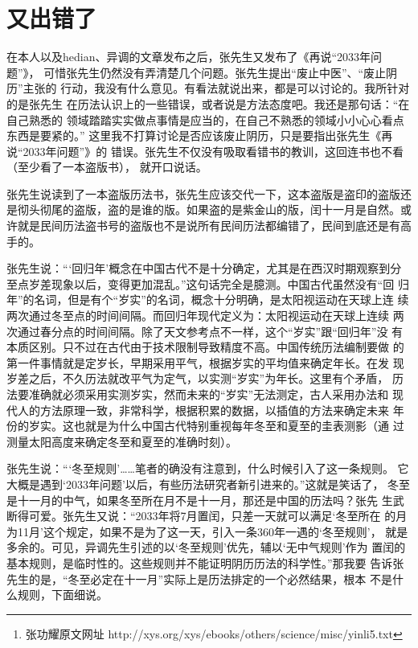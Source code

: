 \chapter{又出错了}

\subtitle{——评张功耀《再说“2033年问题”》\footnote{张功耀原文网址 http://xys.org/xys/ebooks/others/science/misc/yinli5.txt}}

在本人以及hedian、异调的文章发布之后，张先生又发布了《再说“2033年问题”》，
可惜张先生仍然没有弄清楚几个问题。张先生提出“废止中医”、“废止阴历”主张的
行动，我没有什么意见。有看法就说出来，都是可以讨论的。我所针对的是张先生
在历法认识上的一些错误，或者说是方法态度吧。我还是那句话：“在自己熟悉的
领域踏踏实实做点事情是应当的，在自己不熟悉的领域小小心心看点东西是要紧的。”
这里我不打算讨论是否应该废止阴历，只是要指出张先生《再说“2033年问题”》的
错误。张先生不仅没有吸取看错书的教训，这回连书也不看（至少看了一本盗版书），
就开口说话。

张先生说读到了一本盗版历法书，张先生应该交代一下，这本盗版是盗印的盗版还
是彻头彻尾的盗版，盗的是谁的版。如果盗的是紫金山的版，闰十一月是自然。或
许就是民间历法盗书号的盗版也不是说所有民间历法都编错了，民间到底还是有高
手的。

张先生说：“‘回归年’概念在中国古代不是十分确定，尤其是在西汉时期观察到分
至点岁差现象以后，变得更加混乱。”这句话完全是臆测。中国古代虽然没有“回
归年”的名词，但是有个“岁实”的名词，概念十分明确，是太阳视运动在天球上连
续两次通过冬至点的时间间隔。而回归年现代定义为：太阳视运动在天球上连续
两次通过春分点的时间间隔。除了天文参考点不一样，这个“岁实”跟“回归年”没
有本质区别。只不过在古代由于技术限制导致精度不高。中国传统历法编制要做
的第一件事情就是定岁长，早期采用平气，根据岁实的平均值来确定年长。在发
现岁差之后，不久历法就改平气为定气，以实测“岁实”为年长。这里有个矛盾，
历法要准确就必须采用实测岁实，然而未来的“岁实”无法测定，古人采用办法和
现代人的方法原理一致，非常科学，根据积累的数据，以插值的方法来确定未来
年份的岁实。这也就是为什么中国古代特别重视每年冬至和夏至的圭表测影（通
过测量太阳高度来确定冬至和夏至的准确时刻）。

张先生说：“‘冬至规则’……笔者的确没有注意到，什么时候引入了这一条规则。
它大概是遇到‘2033年问题’以后，有些历法研究者新引进来的。”这就是笑话了，
冬至是十一月的中气，如果冬至所在月不是十一月，那还是中国的历法吗？张先
生武断得可爱。张先生又说：“2033年将7月置闰，只差一天就可以满足‘冬至所在
的月为11月’这个规定，如果不是为了这一天，引入一条360年一遇的‘冬至规则’，
就是多余的。可见，异调先生引述的以‘冬至规则’优先，辅以‘无中气规则’作为
置闰的基本规则，是临时性的。这些规则并不能证明阴历历法的科学性。”那我要
告诉张先生的是，“冬至必定在十一月”实际上是历法排定的一个必然结果，根本
不是什么规则，下面细说。


